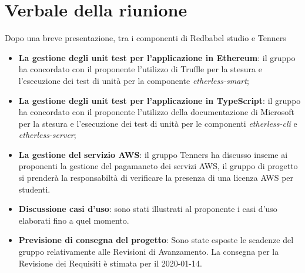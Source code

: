 \section{Verbale della riunione}
		Dopo una breve presentazione, tra i componenti di Redbabel studio e Tenners
	\begin{itemize}

		\item \textbf {La gestione degli unit test per l'applicazione in Ethereum}:
		il gruppo ha concordato con il proponente l'utilizzo di Truffle per la stesura
		e l'esecuzione dei test di unità per la componente \textit{etherless-smart};

		\item \textbf {La gestione degli unit test per l'applicazione in TypeScript}:
		il gruppo ha concordato con il proponente l'utilizzo della documentazione di Microsoft per la stesura
		e l'esecuzione dei test di unità per le componenti \textit{etherless-cli} e \textit{etherless-server};

		\item \textbf {La gestione del servizio AWS}: il gruppo Tenners ha  discusso
		inseme ai proponenti la gestione del pagamaneto dei servizi AWS,
		il gruppo di progetto si prenderà la responsabiltà di verificare la presenza
		di una licenza AWS per studenti.

		\item \textbf {Discussione casi d'uso}: sono stati illustrati al proponente
		i casi d'uso elaborati fino a quel momento.

		\item \textbf {Previsione di consegna del progetto}: Sono state esposte le
		scadenze del gruppo relativamente alle Revisioni di Avanzamento.
		La consegna per la Revisione dei Requisiti è stimata per il 2020-01-14.
	\end{itemize}
